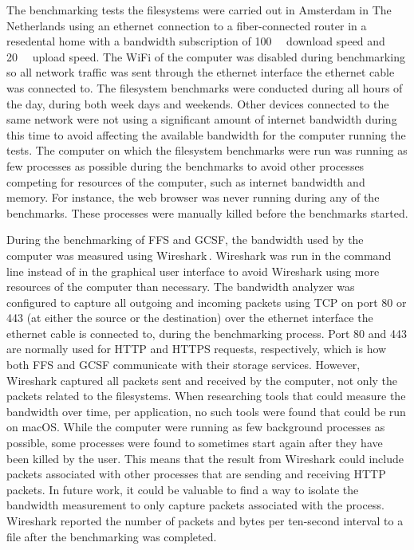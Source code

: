The benchmarking tests the filesystems were carried out in Amsterdam in The Netherlands using an ethernet connection to a \mbox{fiber-connected} router in a resedental home with a bandwidth subscription of \SI{100}{\mega\bit} download speed and \SI{20}{\mega\bit} upload speed. The WiFi of the computer was disabled during benchmarking so all network traffic was sent through the ethernet interface the ethernet cable was connected to. The filesystem benchmarks were conducted during all hours of the day, during both week days and weekends. Other devices connected to the same network were not using a significant amount of internet bandwidth during this time to avoid affecting the available bandwidth for the computer running the tests. The computer on which the filesystem benchmarks were run was running as few processes as possible during the benchmarks to avoid other processes competing for resources of the computer, such as internet bandwidth and memory. For instance, the web browser was never running during any of the benchmarks. These processes were manually killed before the benchmarks started.

During the benchmarking of \gls{FFS} and \gls{GCSF}, the bandwidth used by the computer was measured using Wireshark\,\cite{WiresharkGoDeep}. Wireshark was run in the command line instead of in the graphical user interface to avoid Wireshark using more resources of the computer than necessary. The bandwidth analyzer was configured to capture all outgoing and incoming packets using TCP on port 80 or 443 (at either the source or the destination) over the ethernet interface the ethernet cable is connected to, during the benchmarking process. Port 80 and 443 are normally used for HTTP and HTTPS requests, respectively, which is how both \gls{FFS} and \gls{GCSF} communicate with their storage services. However, Wireshark captured all packets sent and received by the computer, not only the packets related to the filesystems. When researching tools that could measure the bandwidth over time, per application, no such tools were found that could be run on macOS. While the computer were running as few background processes as possible, some processes were found to sometimes start again after they have been killed by the user. This means that the result from Wireshark could include packets associated with other processes that are sending and receiving HTTP packets. In future work, it could be valuable to find a way to isolate the bandwidth measurement to only capture packets associated with the process. Wireshark reported the number of packets and bytes per ten-second interval to a file after the benchmarking was completed. 

